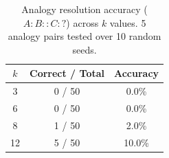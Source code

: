 \begin{table}[h]
\centering
\caption{Analogy resolution accuracy ($A:B::C:?$) across $k$ values. 5 analogy pairs tested over 10 random seeds.}
\label{tab:analogy}
\begin{tabular}{ccc}
\toprule
$k$ & Correct / Total & Accuracy \\
\midrule
3 & 0 / 50 & 0.0\% \\
6 & 0 / 50 & 0.0\% \\
8 & 1 / 50 & 2.0\% \\
12 & 5 / 50 & 10.0\% \\
\bottomrule
\end{tabular}
\end{table}
